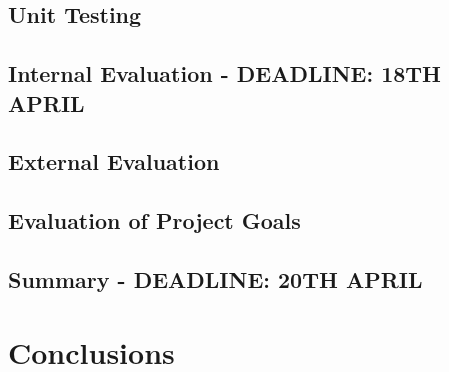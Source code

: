 \documentclass[12pt,a4paper,twoside,openright]{report}
\begin{document}
\begin{comment}
Evaluation and conclusions worth 20\%

This is where Assessors will be looking for signs of success and for evidence of thorough and systematic evaluation as discussed in Section 8.3. Sample output, tables of timings and photographs of workstation screens, oscilloscope traces or circuit boards may be included. A graph that does not indicate confidence intervals will generally leave a professional scientist with a negative impression.

As with code, voluminous examples of sample output are usually best left to appendices or omitted altogether.

There are some obvious questions which this chapter will address. How many of the original goals were achieved? Were they proved to have been achieved? Did the program, hardware, or theory really work?

Assessors are well aware that large programs will very likely include some residual bugs. It should always be possible to demonstrate that a program works in simple cases and it is instructive to demonstrate how close it is to working in a really ambitious case.

\end{comment}

\section{Unit Testing}


\section{Internal Evaluation - DEADLINE: 18TH APRIL}


\section{External Evaluation}


\section{Evaluation of Project Goals}


\section{Summary - DEADLINE: 20TH APRIL}


\chapter{Conclusions}
\end{document}
